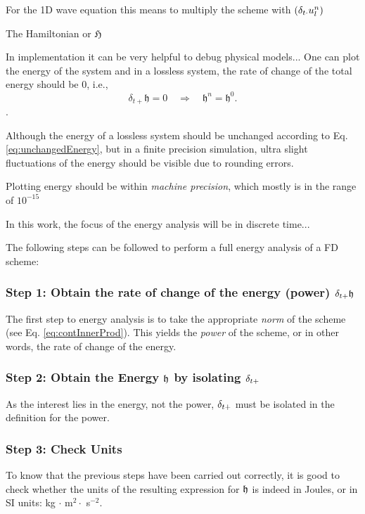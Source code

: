 {{


For the 1D wave equation this means to multiply the scheme with $\left(\delta_{t\cdot} u_l^n \right)$


The Hamiltonian or $\mathfrak{H}$


In implementation it can be very helpful to debug physical models...
One can plot the energy of the system and in a lossless system, the rate of change of the total energy should be 0, i.e.,
\begin{equation}\label{eq:unchangedEnergy}
    \delta_{t+}\mathfrak{h} = 0 \quad \Longrightarrow \quad \mathfrak{h}^n = \mathfrak{h}^0.
\end{equation}
.

Although the energy of a lossless system should be unchanged according to Eq. \eqref{eq:unchangedEnergy}, but in a finite precision simulation, ultra slight fluctuations of the energy should be visible due to rounding errors. 

Plotting energy should be within \textit{machine precision}, which mostly is in the range of $10^{-15}$

In this work, the focus of the energy analysis will be in discrete time...

The following steps can be followed to perform a full energy analysis of a FD scheme:
\subsubsection{Step 1: Obtain the rate of change of the energy (power) $\delta_{t+} \mathfrak{h}$}
 The first step to energy analysis is to take the appropriate \textit{norm} of the scheme (see Eq. \eqref{eq:contInnerProd}). This yields the \textit{power} of the scheme, or in other words, the rate of change of the energy.

 \subsubsection{Step 2: Obtain the Energy $\mathfrak{h}$ by isolating $\delta_{t+}$}
 As the interest lies in the energy, not the power, $\delta_{t+}$ must be isolated in the definition for the power.

\subsubsection{Step 3: Check Units}
To know that the previous steps have been carried out correctly, it is good to check whether the units of the resulting expression for $\mathfrak{h}$ is indeed in Joules, or in SI units: kg $\cdot$ m$^2 \cdot $ s$^{-2}$. 

}}
